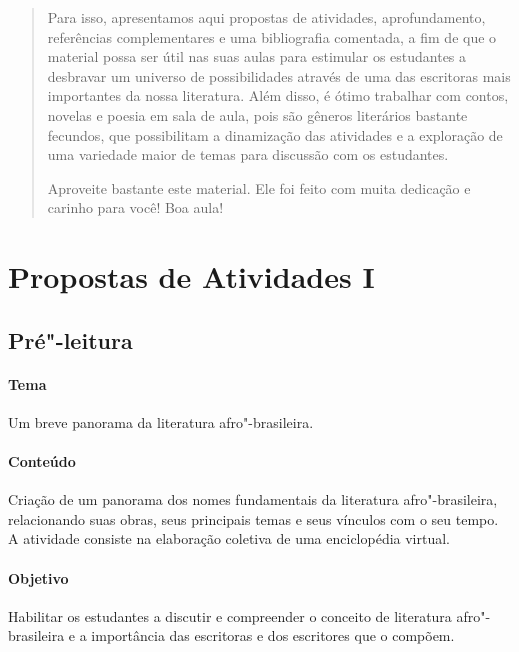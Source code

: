 \documentclass[12pt]{extarticle}
\begin{document}
\begin{abstract}
Para isso, apresentamos aqui propostas de atividades, aprofundamento,
referências complementares e uma bibliografia comentada, a fim de que o
material possa ser útil nas suas aulas para estimular os estudantes a
desbravar um universo de possibilidades através de uma das escritoras
mais importantes da nossa literatura. Além disso, é ótimo trabalhar com
contos, novelas e poesia em sala de aula, pois são gêneros literários
bastante fecundos, que possibilitam a dinamização das atividades e a
exploração de uma variedade maior de temas para discussão com os
estudantes.

Aproveite bastante este material. Ele foi feito com muita dedicação e
carinho para você! Boa aula!
\end{abstract}

\tableofcontents


\section{Propostas de Atividades I}

\subsection{Pré"-leitura}

\paragraph{Tema} Um breve panorama da literatura afro"-brasileira.

\paragraph{Conteúdo} Criação de um panorama dos nomes fundamentais da
literatura afro"-brasileira, relacionando suas obras, seus principais
temas e seus vínculos com o seu tempo. A atividade consiste na
elaboração coletiva de uma enciclopédia virtual.

\paragraph{Objetivo} Habilitar os estudantes a discutir e compreender o
conceito de literatura afro"-brasileira e a importância das escritoras e
dos escritores que o compõem.
\end{document}
